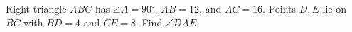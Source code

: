 Right triangle $ABC$ has $\angle A=90^\circ$, $AB=12$, and $AC=16$. Points $D,E$ lie on $BC$ with $BD=4$ and $CE=8$. Find $\angle DAE$.
